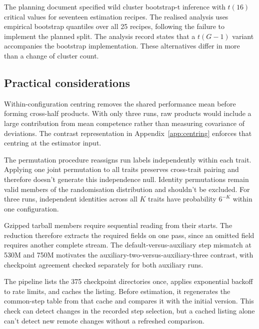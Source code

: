 The planning document specified wild cluster bootstrap-t inference with $t(16)$ critical values for seventeen estimation recipes. The realised analysis uses empirical bootstrap quantiles over all 25 recipes, following the failure to implement the planned split. The analysis record states that a $t(G-1)$ variant accompanies the bootstrap implementation. These alternatives differ in more than a change of cluster count.

\subsection{Practical considerations}
Within-configuration centring removes the shared performance mean before forming cross-half products. With only three runs, raw products would include a large contribution from mean competence rather than measuring covariance of deviations. The contrast representation in Appendix~\ref{app:centring} enforces that centring at the estimator input.

The permutation procedure reassigns run labels independently within each trait. Applying one joint permutation to all traits preserves cross-trait pairing and therefore doesn't generate this independence null. Identity permutations remain valid members of the randomisation distribution and shouldn't be excluded. For three runs, independent identities across all $K$ traits have probability $6^{-K}$ within one configuration.

Gzipped tarball members require sequential reading from their starts. The reduction therefore extracts the required fields on one pass, since an omitted field requires another complete stream. The default-versus-auxiliary step mismatch at 530M and 750M motivates the auxiliary-two-versus-auxiliary-three contrast, with checkpoint agreement checked separately for both auxiliary runs.

The pipeline lists the 375 checkpoint directories once, applies exponential backoff to rate limits, and caches the listing. Before estimation, it regenerates the common-step table from that cache and compares it with the initial version. This check can detect changes in the recorded step selection, but a cached listing alone can't detect new remote changes without a refreshed comparison.

